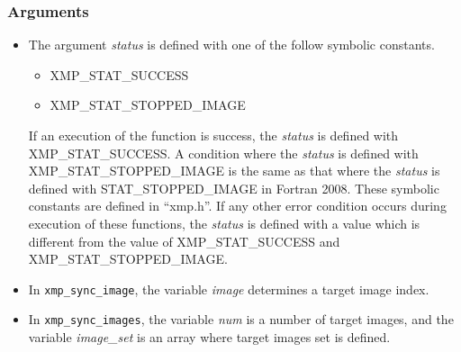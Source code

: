 \subsubsection*{Arguments}
\begin{itemize}
  \item The argument {\it status} is defined with one of the follow symbolic constants.
  \begin{itemize}
    \item XMP\_STAT\_SUCCESS
    \item XMP\_STAT\_STOPPED\_IMAGE
  \end{itemize}
  If an execution of the function is success, the {\it status} is defined with XMP\_STAT\_SUCCESS.
  A condition where the {\it status} is defined with XMP\_STAT\_STOPPED\_IMAGE is the same as 
  that where the {\it status} is defined with STAT\_STOPPED\_IMAGE in Fortran 2008.
  These symbolic constants are defined in ``xmp.h''.
  If any other error condition occurs during execution of these functions,
  the {\it status} is defined with a value which is different from the value of XMP\_STAT\_SUCCESS and
  XMP\_STAT\_STOPPED\_IMAGE.
  \item In {\tt xmp\_sync\_image}, the variable {\it image} determines a target image index.
  \item In {\tt xmp\_sync\_images}, the variable {\it num} is a number of target images, and 
        the variable {\it image\_set} is an array where target images set is defined.
\end{itemize}

